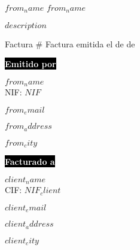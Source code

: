 \documentclass[spanish,$fontsize$, a4paper]{article}
\begin{document}
%
$from_name$
{\HUGE \textbf{$from_name$}}\\ %

\hspace{10pt}

\textbf{$description$} \\

\hspace{10pt}

Factura \# {\twodigit{\the\day}}{\twodigit{\the\month}}{\the\year}
\hfill
Factura emitida el {\twodigit{\the\day}} de {\shortmonthname} de {\the\year}

\hspace{10pt}

 \begin{minipage}[t]{0.5\textwidth}
    \begin{flushleft}
    
    \colorbox{black}{{\textcolor{white}{\textbf{Emitido por}}}}
    \vspace{5pt}
    
		$from_name$\\
		\vspace{3pt}
		NIF: $NIF$\\
		\vspace{3pt}
    	
    
        $from_email$\\
        		\vspace{3pt}
        

		$from_address$\\
				\vspace{3pt}

		$from_city$
				\vspace{3pt}
    \end{flushleft}
\end{minipage}%
%
\begin{minipage}[t]{0.5\textwidth}
    \begin{flushright}
    
\colorbox{black}{{\textcolor{white}{\textbf{Facturado a}}}}
\vspace{5pt}

		$client_name$\\
		\vspace{3pt}
	CIF: $NIF_client$\\
			\vspace{3pt}

	
	     $client_email$\\
		\vspace{3pt}

	$client_address$\\
		\vspace{3pt}

	$client_city$
			\vspace{3pt}
    \end{flushright}
\end{minipage}%
\end{document}
